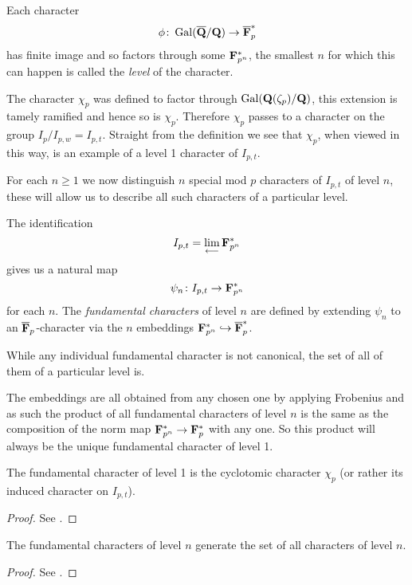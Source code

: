 \documentclass[a4paper,12pt]{article}
\begin{document}
\begin{defn}
Each character
\[
\phi \colon \operatorname{Gal}(\overline{\mathbf{Q}}/\mathbf{Q}) \to \overline{\mathbf{F}}_p^*
\]
has finite image and so factors through some $\mathbf{F}_{p^n}^*$, the smallest $n$ for which this can happen is called the \emph{level} of the character.
\end{defn}

The character $\chi_p$ was defined to factor through $\operatorname{Gal}(\mathbf{Q}(\zeta_p)/\mathbf{Q})$, this extension is tamely ramified and hence so is $\chi_p$.
Therefore $\chi_p$ passes to a character on the group $I_{p}/I_{p,w} = I_{p,t}$.
Straight from the definition we see that $\chi_p$, when viewed in this way, is an example of a level 1 character of $I_{p,t}$.

For each $n \ge 1$ we now distinguish $n$ special mod $p$ characters of $I_{p,t}$ of level $n$, these will allow us to describe all such characters of a particular level.

\begin{defn}\label{def:fund}
The identification
\[
I_{p,t}  =  \lim_{\longleftarrow} \mathbf{F}_{p^n}^*
\]
gives us a natural map
\[
\psi_n\colon I_{p,t} \to \mathbf{F}_{p^n}^*
\]
for each $n$.
The \emph{fundamental characters} of level $n$ are defined by extending $\psi_n$ to an $\overline{\mathbf{F}}_p$-character via the $n$ embeddings $\mathbf{F}_{p^n}^* \hookrightarrow \overline{\mathbf{F}}_p^*$.

While any individual fundamental character is not canonical, the set of all of them of a particular level is.
\end{defn}

\begin{rmk}\label{rmk:prodchar}
The embeddings are all obtained from any chosen one by applying Frobenius and as such the product of all fundamental characters of level $n$ is the same as the composition of the norm map $\mathbf{F}_{p^n}^* \to \mathbf{F}_p^*$ with any one.
So this product will always be the unique fundamental character of level 1.
\end{rmk}

\begin{prop}
The fundamental character of level 1 is the cyclotomic character $\chi_p$ (or rather its induced character on $I_{p,t}$).
\end{prop}
\begin{proof}
See \cite[prop. 8]{Serre72}.
\end{proof}

\begin{prop}
The fundamental characters of level $n$ generate the set of all characters of level $n$.
\end{prop}
\begin{proof}
See \cite[prop. 5]{Serre72}.
\end{proof}
\end{document}
